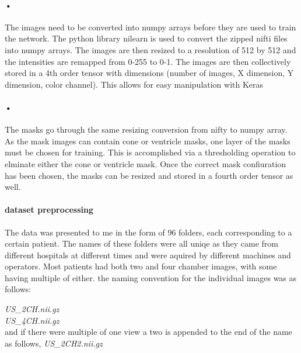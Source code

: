 \documentclass{article}
\begin{document}
\paragraph{•}
The images need to be converted into numpy arrays before they are used to train the network. The python library nilearn is used to convert the zipped nifti files into numpy arrays. The images are then resized to a resolution of 512 by 512 and the intensities are remapped from 0-255 to 0-1. The images are then collectively stored in a 4th order tensor with dimensions (number of images, X dimension, Y dimension, color channel). This allows for easy manipulation with Keras
\paragraph{•}
The masks go through the same resizing conversion from nifty to numpy array. As the mask images can contain cone or ventricle masks, one layer of the masks must be chosen for training. This is accomplished via a thresholding operation to elminate either the cone or ventricle mask. Once the correct mask confiuration has been chosen, the masks can be resized and stored in a fourth order tensor as well.
\paragraph{dataset preprocessing}
The data was presented to me in the form of 96 folders, each corresponding to a certain patient.
The names of these folders were all uniqe as they came from different hospitals at different times and were aquired by different machines and operators.
Most patients had both two and four chamber images, with some having multiple of either. 
the naming convention for the individual images was as follows:

\textit{US\_2CH.nii.gz}\\
\textit{US\_4CH.nii.gz}\\
and if there were multiple of one view a two is appended to the end of the name as follows,
\textit{US\_2CH2.nii.gz}\\
\end{document}
